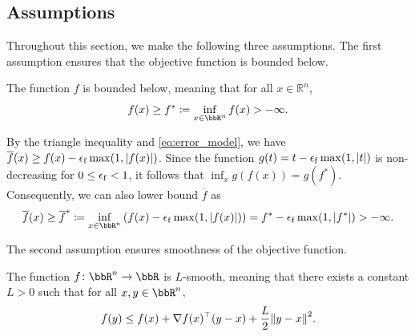 \documentclass[journal]{subfiles}
\begin{document}
\subsection{Assumptions}\label{sec:assumptions}

Throughout this section, we make the following three assumptions.
The first assumption ensures that the objective function is bounded below.
\begin{assumption}\label{ass:bounded}
    The function $f$ is bounded below, meaning that for all $x \in \mathbb{R}^n$,
    \begin{equation*}
        f(x) \ge f^* \defeq \inf_{x \in \bbR^n} f(x) > -\infty .
    \end{equation*}
\end{assumption}
By the triangle inequality and \cref{eq:error_model}, we have
$\overline{f}(x) \ge f(x) - \epsilon_\mathrm{f} \max(1, \abs{f(x)})$.
Since the function $g(t) = t - \epsilon_\mathrm{f} \max(1, \abs{t})$ is non-decreasing for $0 \le \epsilon_\mathrm{f} < 1$, it follows that $\inf_x g(f(x)) = g(f^*)$.
Consequently, we can also lower bound $\overline{f}$ as
\begin{equation}\label{eq:ass_bounded_overline_f}
    \overline{f}(x) \ge
    \overline{f}^*
    \defeq \inf_{x \in \bbR^n} \qty( f(x) - \feps \max(1, \abs{f(x)}) )
    = f^* - \feps \max(1, \abs{f^*})
    > -\infty .
\end{equation}

The second assumption ensures smoothness of the objective function.
\begin{assumption}\label{ass:LSmooth}
    The function $f \colon \bbR^n \to \bbR$ is $L$-smooth, meaning that there exists
    a constant $L > 0$ such that for all $x, y \in \bbR^n$,
    \begin{equation*}
        f(y) \le f(x) + \nabla f(x)^\top (y - x) + \frac{L}{2} \norm{y - x}^2.
    \end{equation*}
\end{assumption}
\end{document}
